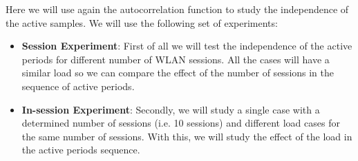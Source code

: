 Here we will use again the autocorrelation function to study the independence of the active samples. We will use the following set of experiments:

\begin{itemize}
	\item \textbf{Session Experiment}: First of all we will test the independence of the active periods for different number of \acs{WLAN} sessions. All the cases will have a similar load so we can compare the effect of the number of sessions in the sequence of active periods.
	\item \textbf{In-session Experiment}: Secondly, we will study a single case with a determined number of sessions (i.e. 10 sessions) and different load cases for the same number of sessions. With this, we will study the effect of the load in the active periods sequence.
\end{itemize}